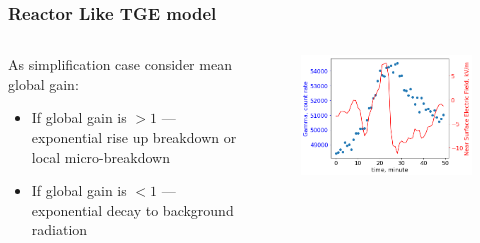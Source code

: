 \documentclass[8pt,pdf,hyperref={unicode}]{beamer}
\begin{document}
\usebackgroundtemplate{}
\begin{frame}
\frametitle{Reactor Like TGE model}
\begin{columns}
    \begin{column}{0.5\textwidth}
{\large         As simplification case consider mean global gain:
        \begin{itemize}
            \item  If global gain is $> 1$ --- exponential rise up breakdown or local micro-breakdown
            \item If global gain is $< 1$ --- exponential decay to background radiation
        \end{itemize}}
    \end{column}
    \begin{column}{0.5\textwidth}
        \begin{figure}[htb]
            \centering
            \includegraphics[width=1\columnwidth]{aragats.png}
            \\
        \end{figure}
        
    \end{column}
\end{columns}

\end{frame}
\end{document}
